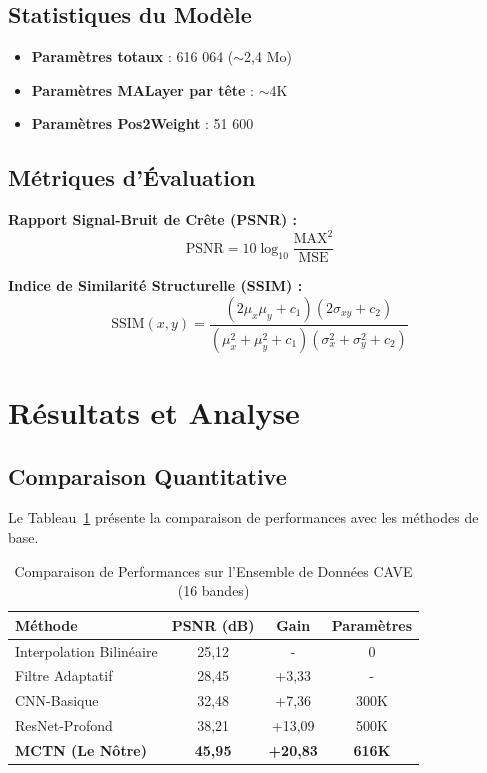 \documentclass[conference]{IEEEtran}
\begin{document}
\subsection{Statistiques du Modèle}

\begin{itemize}
    \item \textbf{Paramètres totaux} : 616 064 ($\sim$2,4 Mo)
    \item \textbf{Paramètres MALayer par tête} : $\sim$4K
    \item \textbf{Paramètres Pos2Weight} : 51 600
\end{itemize}

\subsection{Métriques d'Évaluation}

\textbf{Rapport Signal-Bruit de Crête (PSNR) :}
\begin{equation}
\text{PSNR} = 10 \log_{10} \frac{\text{MAX}^2}{\text{MSE}}
\end{equation}

\textbf{Indice de Similarité Structurelle (SSIM) :}
\begin{equation}
\text{SSIM}(x,y) = \frac{(2\mu_x\mu_y + c_1)(2\sigma_{xy} + c_2)}{(\mu_x^2 + \mu_y^2 + c_1)(\sigma_x^2 + \sigma_y^2 + c_2)}
\end{equation}

\section{Résultats et Analyse}

\subsection{Comparaison Quantitative}

Le Tableau~\ref{tab:comparison} présente la comparaison de performances avec les méthodes de base.

\begin{table}[h]
\centering
\caption{Comparaison de Performances sur l'Ensemble de Données CAVE (16 bandes)}
\label{tab:comparison}
\begin{tabular}{lccc}
\toprule
\textbf{Méthode} & \textbf{PSNR (dB)} & \textbf{Gain} & \textbf{Paramètres} \\
\midrule
Interpolation Bilinéaire & 25,12 & - & 0 \\
Filtre Adaptatif \cite{b3} & 28,45 & +3,33 & - \\
CNN-Basique \cite{b4} & 32,48 & +7,36 & 300K \\
ResNet-Profond \cite{b5} & 38,21 & +13,09 & 500K \\
\midrule
\textbf{MCTN (Le Nôtre)} & \textbf{45,95} & \textbf{+20,83} & \textbf{616K} \\
\bottomrule
\end{tabular}
\end{table}
\end{document}
